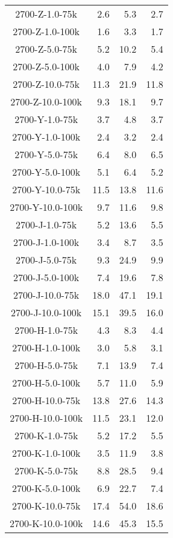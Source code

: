 \begin{longtable}{crrr}
    2700-Z-1.0-75k &   2.6 &    5.3 &   2.7 \\
    2700-Z-1.0-100k &   1.6 &    3.3 &   1.7 \\
    2700-Z-5.0-75k &   5.2 &   10.2 &   5.4 \\
    2700-Z-5.0-100k &   4.0 &    7.9 &   4.2 \\
    2700-Z-10.0-75k &  11.3 &   21.9 &  11.8 \\
    2700-Z-10.0-100k &   9.3 &   18.1 &   9.7 \\
    2700-Y-1.0-75k &   3.7 &    4.8 &   3.7 \\
    2700-Y-1.0-100k &   2.4 &    3.2 &   2.4 \\
    2700-Y-5.0-75k &   6.4 &    8.0 &   6.5 \\
    2700-Y-5.0-100k &   5.1 &    6.4 &   5.2 \\
    2700-Y-10.0-75k &  11.5 &   13.8 &  11.6 \\
    2700-Y-10.0-100k &   9.7 &   11.6 &   9.8 \\
    2700-J-1.0-75k &   5.2 &   13.6 &   5.5 \\
    2700-J-1.0-100k &   3.4 &    8.7 &   3.5 \\
    2700-J-5.0-75k &   9.3 &   24.9 &   9.9 \\
    2700-J-5.0-100k &   7.4 &   19.6 &   7.8 \\
    2700-J-10.0-75k &  18.0 &   47.1 &  19.1 \\
    2700-J-10.0-100k &  15.1 &   39.5 &  16.0 \\
    2700-H-1.0-75k &   4.3 &    8.3 &   4.4 \\
    2700-H-1.0-100k &   3.0 &    5.8 &   3.1 \\
    2700-H-5.0-75k &   7.1 &   13.9 &   7.4 \\
    2700-H-5.0-100k &   5.7 &   11.0 &   5.9 \\
    2700-H-10.0-75k &  13.8 &   27.6 &  14.3 \\
    2700-H-10.0-100k &  11.5 &   23.1 &  12.0 \\
    2700-K-1.0-75k &   5.2 &   17.2 &   5.5 \\
    2700-K-1.0-100k &   3.5 &   11.9 &   3.8 \\
    2700-K-5.0-75k &   8.8 &   28.5 &   9.4 \\
    2700-K-5.0-100k &   6.9 &   22.7 &   7.4 \\
    2700-K-10.0-75k &  17.4 &   54.0 &  18.6 \\
    2700-K-10.0-100k &  14.6 &   45.3 &  15.5 \\

\end{longtable}
